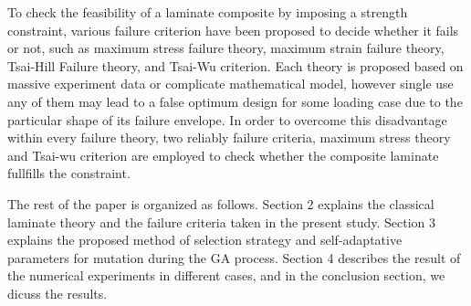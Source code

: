 To check the feasibility of a laminate composite by imposing a strength
constraint, various failure criterion have been proposed to decide whether it
fails or not, such as  maximum stress failure theory, maximum strain failure
theory, Tsai-Hill Failure theory, and Tsai-Wu criterion. Each theory is proposed
based on massive experiment data or complicate mathematical model, however
single use any of them may lead to a false optimum design for some loading case
due to the particular shape of its failure envelope. In order to overcome this
disadvantage within every failure theory, two reliably failure criteria, maximum
stress theory and Tsai-wu criterion are employed to check whether the composite
laminate fullfills the constraint.

The rest of the paper is organized as follows. Section 2 explains the classical laminate theory and
the failure criteria taken in the present study.  Section 3 explains the proposed method of
selection strategy and self-adaptative parameters for mutation during the GA process. Section 4
describes the result of the numerical experiments in different cases, and in the conclusion section,
we dicuss the results.


